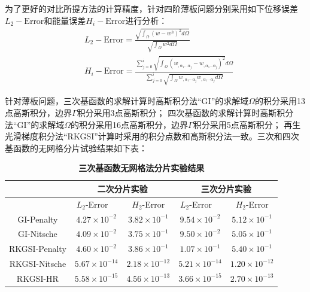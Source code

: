 为了更好的对比所提方法的计算精度，针对四阶薄板问题分别采用如下位移误差$L_2-\text{Error}$和能量误差$H_i-\text{Error}$进行分析：
\begin{equation}
\begin{split}
    &L_2-\text{Error}=\frac{\sqrt{\int_{\Omega}(w-w^h)^2d\Omega}}{\sqrt{\int_{\Omega}w^2d\Omega}}\\
    &H_i-\text{Error}=\frac{\sum_{j=0}^{i}\sqrt{\int_{\Omega}(w_{,\alpha_1\dotsb \alpha_j}-w_{,\alpha_1\dotsb \alpha_j})^2}d\Omega}{\sum_{j=0}^{i}\sqrt{\int_{\Omega}w_{,\alpha_1\dotsb \alpha_j}w_{,\alpha_1\dotsb \alpha_j}d\Omega}}
\end{split}
\end{equation}\par
针对薄板问题，三次基函数的求解计算时高斯积分法“GI”的求解域$\Omega$的积分采用13点高斯积分，边界$\Gamma$积分采用3点高斯积分；
四次基函数的求解计算时高斯积分法“GI”的求解域$\Omega$的积分采用16点高斯积分，边界$\Gamma$积分采用5点高斯积分；
再生光滑梯度积分法“RKGSI”计算时采用的积分点数和高斯积分法一致。三次和四次基函数的无网格分片试验结果如下表：
\newpage
\begin{table}[H]
    \caption{\textbf{三次基函数无网格法分片实验结果}}
    \centering\label{cubic}
   \begin{tabular}{ccccc}
   \toprule
    $\quad$&\multicolumn{2}{c}{二次分片实验}&\multicolumn{2}{c}{三次分片实验}\\
   \midrule
   &$L_2$-Error$\quad$&$H_2$-Error&$L_2$-Error$\quad$&$H_2$-Error\\
   \midrule
   GI-Penalty&$4.27\times10^{-2}$&$3.82\times10^{-1}$&$9.54\times10^{-2}$&$5.12\times10^{-1}$\\
   GI-Nitsche&$4.09\times10^{-2}$&$3.75\times10^{-1}$&$9.50\times10^{-2}$&$5.05\times10^{-1}$\\
  RKGSI-Penalty&$4.60\times10^{-2}$&$3.86\times10^{-1}$&$1.07\times10^{-1}$&$5.40\times10^{-1}$\\
  RKGSI-Nitsche&$5.67\times10^{-14}$&$2.18\times10^{-12}$&$5.21\times10^{-14}$&$1.20\times10^{-12}$\\
  RKGSI-HR&$5.58\times10^{-15}$&$4.56\times10^{-13}$&$3.66\times10^{-15}$&$2.70\times10^{-13}$\\
   \bottomrule
   \end{tabular}
   \end{table}
